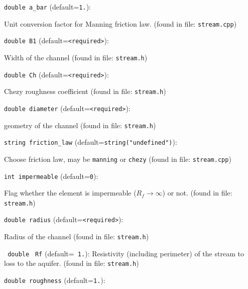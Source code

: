 \item\verb+double a_bar+ {\rm(default=\verb|1.|)}:

Unit conversion factor for Manning friction law.
 (found in file: \verb+stream.cpp+)
\item\verb+double B1+ {\rm(default=\verb|<required>|)}:

Width of the channel
 (found in file: \verb+stream.h+)
\item\verb+double Ch+ {\rm(default=\verb|<required>|)}:

Chezy roughness coefficient
 (found in file: \verb+stream.h+)
\item\verb+double diameter+ {\rm(default=\verb|<required>|)}:

geometry of the channel
 (found in file: \verb+stream.h+)
\item\verb+string friction_law+ {\rm(default=\verb|string("undefined")|)}:

Choose friction law, may be {\tt manning} or {\tt chezy}
 (found in file: \verb+stream.cpp+)
\item\verb+int impermeable+ {\rm(default=\verb|0|)}:

Flag whether the element is impermeable ($R_f\to\infty$) or not. 
 (found in file: \verb+stream.h+)
\item\verb+double radius+ {\rm(default=\verb|<required>|)}:

Radius of the channel
 (found in file: \verb+stream.h+)
\item\verb+ double+ \verb+ Rf+ {\rm(default=\verb| 1.|)}:
 Resistivity (including perimeter) of the stream to 
         loss to the aquifer. 
 (found in file: \verb+stream.h+)
\item\verb+double roughness+ {\rm(default=\verb|1.|)}:

